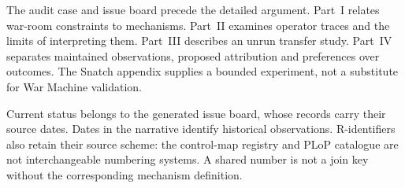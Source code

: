 The audit case and issue board precede the detailed argument. Part~I relates
war-room constraints to mechanisms. Part~II examines operator traces and the
limits of interpreting them. Part~III describes an unrun transfer study.
Part~IV separates maintained observations, proposed attribution and preferences
over outcomes. The Snatch appendix supplies a bounded experiment, not a
substitute for War Machine validation.

Current status belongs to the generated issue board, whose records carry their
source dates. Dates in the narrative identify historical observations.
R-identifiers also retain their source scheme: the control-map registry and
PLoP catalogue are not interchangeable numbering systems. A shared number is
not a join key without the corresponding mechanism definition.
